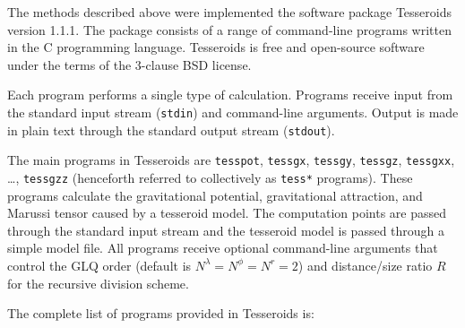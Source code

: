 \documentclass[paper,twocolumn,twoside]{geophysics}
\begin{document}
The methods described above
were implemented the software package
Tesseroids version 1.1.1.
The package consists
of a range of command-line programs
written in the C programming language.
Tesseroids is free and open-source software
under the terms of
the 3-clause BSD license.

Each program performs a single type of calculation.
Programs receive input from
the standard input stream (\texttt{stdin})
and command-line arguments.
Output is made in plain text
through the standard output stream (\texttt{stdout}).

The main programs in Tesseroids are
\texttt{tesspot},
\texttt{tessgx},
\texttt{tessgy},
\texttt{tessgz},
\texttt{tessgxx},
\ldots ,
\texttt{tessgzz}
(henceforth referred to collectively as \texttt{tess*} programs).
These programs
calculate the gravitational potential,
gravitational attraction,
and Marussi tensor
caused by a tesseroid model.
The computation points are passed
through the standard input stream
and the tesseroid model
is passed through
a simple model file.
All programs receive
optional command-line arguments
that control the GLQ order (default is $N^\lambda=N^\phi=N^r=2$)
and distance/size ratio $R$
for the recursive division scheme.

The complete list of programs provided in Tesseroids is:
\end{document}
